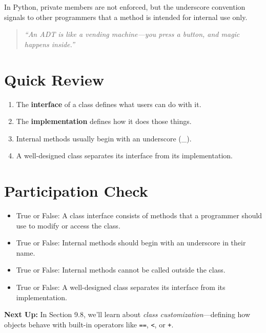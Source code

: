 \vspace{1em}
\noindent
In Python, private members are not enforced, but the underscore convention signals to other programmers that a method is intended for internal use only.

\begin{quote}
\textit{“An ADT is like a vending machine—you press a button, and magic happens inside.”}
\end{quote}

\section{Quick Review}
\begin{enumerate}
    \item The \textbf{interface} of a class defines what users can do with it.
    \item The \textbf{implementation} defines how it does those things.
    \item Internal methods usually begin with an underscore (\_).
    \item A well-designed class separates its interface from its implementation.
\end{enumerate}

\section{Participation Check}
\begin{itemize}
    \item True or False: A class interface consists of methods that a programmer should use to modify or access the class.
    \item True or False: Internal methods should begin with an underscore in their name.
    \item True or False: Internal methods cannot be called outside the class.
    \item True or False: A well-designed class separates its interface from its implementation.
\end{itemize}

\vspace{2em}
\noindent
\textbf{Next Up:} In Section 9.8, we’ll learn about \textit{class customization}—defining how objects behave with built-in operators like \texttt{==}, \texttt{<}, or \texttt{+}.

